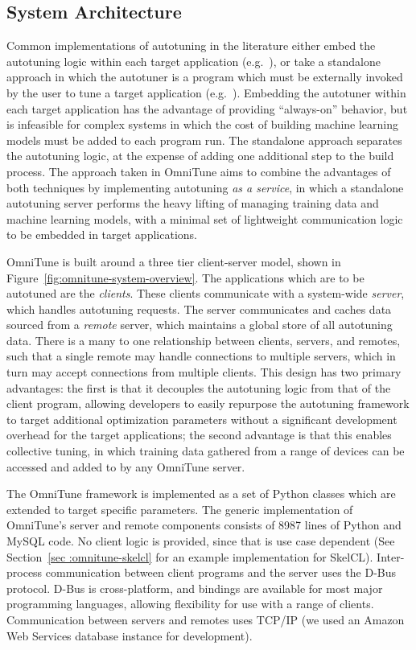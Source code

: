 \documentclass[nonatbib,preprint,nocopyrightspace,9pt]{sigplanconf}
\begin{document}
  \subsection{System Architecture}

  Common implementations of autotuning in the literature either embed the
  autotuning logic within each target application (e.g.~\cite{Chen2014}), or take
  a standalone approach in which the autotuner is a program which must be
  externally invoked by the user to tune a target application
  (e.g.~\cite{Lutz2013}). Embedding the autotuner within each target application
  has the advantage of providing ``always-on'' behavior, but is infeasible for
  complex systems in which the cost of building machine learning models must be
  added to each program run. The standalone approach separates the autotuning
  logic, at the expense of adding one additional step to the build process. The
  approach taken in OmniTune aims to combine the advantages of both techniques by
  implementing autotuning \emph{as a service}, in which a standalone autotuning
  server performs the heavy lifting of managing training data and machine learning
  models, with a minimal set of lightweight communication logic to be embedded in
  target applications.

  OmniTune is built around a three tier client-server model, shown in
  Figure~\ref{fig:omnitune-system-overview}. The applications which are to be
  autotuned are the \emph{clients}. These clients communicate with a system-wide
  \emph{server}, which handles autotuning requests. The server communicates and
  caches data sourced from a \emph{remote} server, which maintains a global store
  of all autotuning data. There is a many to one relationship between clients,
  servers, and remotes, such that a single remote may handle connections to
  multiple servers, which in turn may accept connections from multiple clients.
  This design has two primary advantages: the first is that it decouples the
  autotuning logic from that of the client program, allowing developers to easily
  repurpose the autotuning framework to target additional optimization parameters
  without a significant development overhead for the target applications; the
  second advantage is that this enables collective tuning, in which training data
  gathered from a range of devices can be accessed and added to by any OmniTune
  server.

  The OmniTune framework is implemented as a set of Python classes which are
  extended to target specific parameters. The generic implementation of OmniTune's
  server and remote components consists of 8987 lines of Python and MySQL code. No
  client logic is provided, since that is use case dependent (See Section~\ref{sec
  :omnitune-skelcl} for an example implementation for SkelCL). Inter-process
  communication between client programs and the server uses the D-Bus protocol.
  D-Bus is cross-platform, and bindings are available for most major programming
  languages, allowing flexibility for use with a range of clients. Communication
  between servers and remotes uses TCP/IP (we used an Amazon Web Services database
  instance for development).
\end{document}
